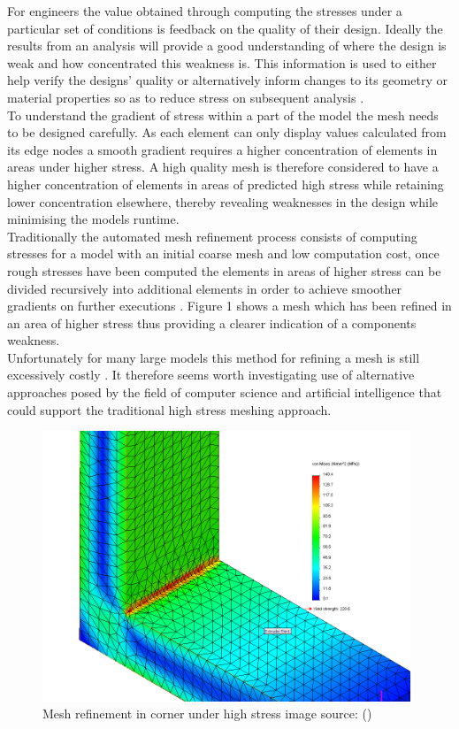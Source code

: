 \documentclass{article}
\begin{document}
\noindent
For engineers the value obtained through computing the stresses under a particular set of conditions is feedback on the quality of their design. Ideally the results from an analysis will provide a good understanding of where the design is weak and how concentrated this weakness is. This information is used to either help verify the designs' quality or alternatively inform changes to its geometry or material properties so as to reduce stress on subsequent analysis \cite{cite06}.\\

\noindent
To understand the gradient of stress within a part of the model the mesh needs to be designed carefully. As each element can only display values calculated from its edge nodes a smooth gradient requires a higher concentration of elements in areas under higher stress. A high quality mesh is therefore considered to have a higher concentration of elements in areas of predicted high stress while retaining lower concentration elsewhere, thereby revealing weaknesses in the design while minimising the models runtime.\\

\noindent
Traditionally the automated mesh refinement process consists of computing stresses for a model with an initial coarse mesh and low computation cost, once rough stresses have been computed the elements in areas of higher stress can be divided recursively into additional elements in order to achieve smoother gradients on further executions \cite{cite03}. Figure 1 shows a mesh which has been refined in an area of higher stress thus providing a clearer indication of a components weakness. \\ 

\noindent
Unfortunately for many large models this method for refining a mesh is still excessively costly \cite{DolsakPaper91}. It therefore seems worth investigating use of alternative approaches posed by the field of computer science and artificial intelligence that could support the traditional high stress meshing approach. 

\begin{figure}
  \centerline{\includegraphics[width=110mm, scale=0.5]{stressedCorner.png}}
  \caption{Mesh refinement in corner under high stress image source: (\cite{HighStressCorner})}
  \label{fig:boat1}
\end{figure}
\end{document}
